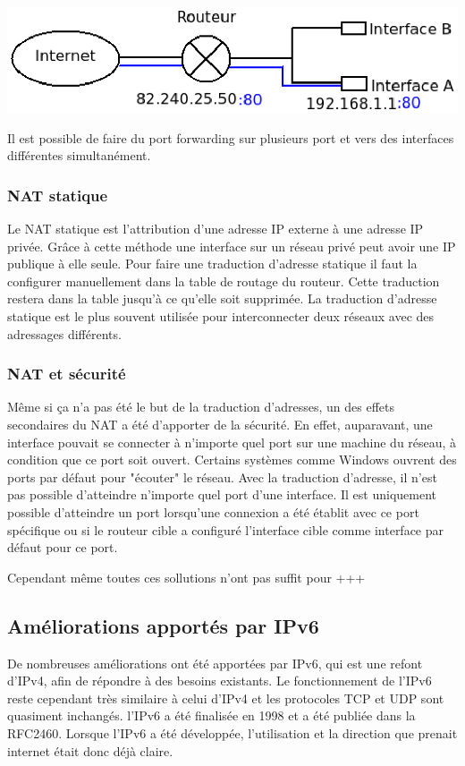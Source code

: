 \includegraphics{./pics/port_forwarding.eps}

Il est possible de faire du port forwarding sur plusieurs port et vers des
interfaces différentes simultanément.

\subsubsection{NAT statique}
Le NAT statique est l'attribution d'une adresse IP externe à une adresse IP 
privée. Grâce à cette méthode une interface sur un réseau privé peut avoir une
IP publique à elle seule. Pour faire une traduction d'adresse statique il faut la configurer
manuellement dans la table de routage du routeur. Cette traduction restera dans
la table jusqu'à ce qu'elle soit supprimée. La traduction d'adresse statique
est le plus souvent utilisée pour interconnecter deux réseaux avec des
adressages différents.

\subsubsection{NAT et sécurité}

Même si ça n'a pas été le but de la traduction d'adresses, un des effets
secondaires du NAT a été d'apporter de la sécurité. En effet, auparavant, une
interface pouvait se connecter à n'importe quel port sur une machine du réseau,
à condition que ce port soit ouvert. Certains systèmes comme Windows ouvrent des ports
par défaut pour "écouter" le réseau. Avec la traduction d'adresse, il n'est pas
possible d'atteindre n'importe quel port d'une interface. Il est uniquement
possible d'atteindre un port lorsqu'une connexion a été établit avec ce port
spécifique ou si le routeur cible a configuré l'interface cible comme interface
par défaut pour ce port.


Cependant même toutes ces sollutions n'ont pas suffit pour +++

\subsection{Améliorations apportés par IPv6}

De nombreuses améliorations ont été apportées par IPv6, qui est une refont d'IPv4, afin de répondre à des besoins existants. Le fonctionnement de l'IPv6 reste cependant très similaire à celui d'IPv4 et 
les protocoles TCP et UDP sont quasiment inchangés.
l'IPv6 a été finalisée en 1998 et a été publiée dans la RFC2460. Lorsque l'IPv6 a été développée, 
l'utilisation et la direction que prenait internet était donc déjà claire. 

